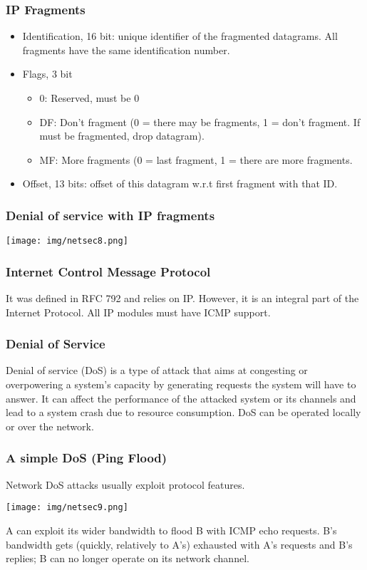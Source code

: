 \documentclass[a4paper, 10pt, titlepage]{article}
\begin{document}
\subsubsection*{IP Fragments}
\begin{itemize}
\item Identification, 16 bit: unique identifier of the fragmented
datagrams. All fragments have the same identification number.
\item Flags, 3 bit
\begin{itemize}
\item 0: Reserved, must be 0
\item DF: Don’t fragment (0 = there may be fragments, 1 = don’t fragment. If must be fragmented, drop datagram).
\item MF: More fragments (0 = last fragment, 1 = there are more fragments.
\end{itemize}
\item Offset, 13 bits: offset of this datagram w.r.t first fragment
with that ID.
 \end{itemize}
 
 
\subsubsection{Denial of service with IP fragments}
\begin{center}
	\texttt{[image: img/netsec8.png]}
\end{center}

\subsubsection*{Internet Control Message Protocol}
It was defined in RFC 792 and relies on IP. However, it is an integral part of the Internet Protocol. All IP modules must have ICMP support.

\subsubsection{Denial of Service}
Denial of service (DoS) is a type of attack that aims at congesting or overpowering a system’s capacity by generating requests the system will have to answer. It can affect the performance of the attacked system or its channels and lead to a system crash due to resource consumption. DoS can be operated locally or over the network.

\subsubsection*{A simple DoS (Ping Flood)}
Network DoS attacks usually exploit protocol features.
\begin{center}
	\texttt{[image: img/netsec9.png]}
\end{center}
A can exploit its wider bandwidth to flood B with ICMP echo requests. B’s bandwidth gets (quickly, relatively to A’s) exhausted with A’s requests and B’s replies; B can no longer operate on its network channel.
\end{document}
